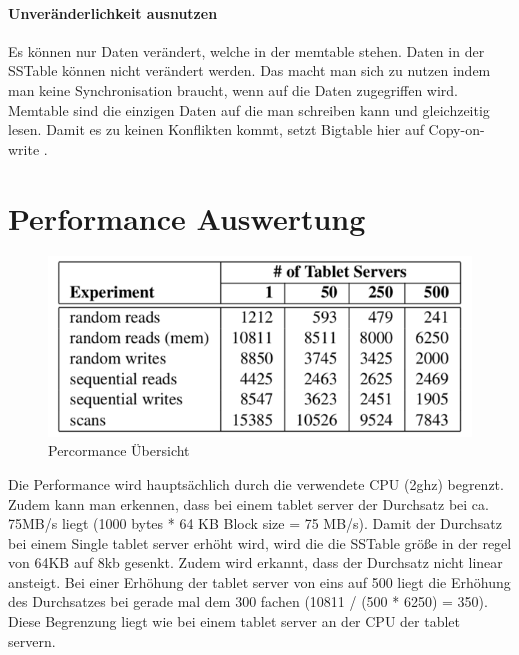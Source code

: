 \paragraph{Unveränderlichkeit ausnutzen}
Es können nur Daten verändert, welche in der memtable stehen. Daten in der SSTable können nicht verändert werden. Das macht man sich zu nutzen indem man keine Synchronisation braucht, wenn auf die Daten zugegriffen wird. Memtable sind die einzigen Daten auf die man schreiben kann und gleichzeitig lesen. Damit es zu keinen Konflikten kommt, setzt Bigtable hier auf \glqq Copy-on-write \grqq. 

\section{Performance Auswertung}
\begin{figure}[!htpb]
	\centering
	\includegraphics[]{pics/bigtable_performance.png}
	\caption {Percormance Übersicht}	
\end{figure}
Die Performance wird hauptsächlich durch die verwendete CPU (2ghz) begrenzt. Zudem kann man erkennen, dass bei einem tablet server der Durchsatz bei ca. 75MB/s liegt (1000 bytes * 64 KB Block size = 75 MB/s). Damit der Durchsatz bei einem Single tablet server erhöht wird, wird die die SSTable größe in der regel von 64KB auf 8kb gesenkt. 
Zudem wird erkannt, dass der Durchsatz nicht linear ansteigt. Bei einer Erhöhung der tablet server von eins auf 500 liegt die Erhöhung des Durchsatzes bei gerade mal dem 300 fachen (10811 / (500 * 6250) = 350). Diese Begrenzung liegt wie bei einem tablet server an der CPU der tablet servern.
